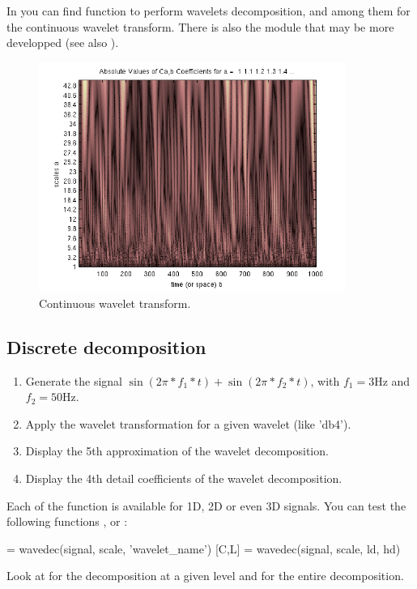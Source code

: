 \begin{phelp}
In  you can find function to perform wavelets decomposition, and among them  for the continuous wavelet transform. There is also the module  that may be more developped (see also ).
\end{phelp}

\begin{figure}[H]
 \centering\caption{Continuous wavelet transform.}%
 \includegraphics[width=10cm]{cwt.png}%
\end{figure}

\subsection{Discrete decomposition}

\begin{qbox}
 \begin{enumerate}
  \item Generate the signal $\sin(2\pi * f_1*t)+ \sin(2\pi*f_2*t)$, with $f_1=3$Hz and $f_2=50$Hz.
  \item Apply the wavelet transformation for a given wavelet (like 'db4'). 
  \item Display the 5th approximation of the wavelet decomposition.
  \item Display the 4th detail coefficients of the wavelet decomposition.
 \end{enumerate}
\end{qbox}

\begin{mcomment}
\begin{mremark}
Each of the \matlabregistered{} function is available for 1D, 2D or even 3D signals. You can test the following functions , 
 or :
\begin{matlab}
[C,L] = wavedec(signal, scale, 'wavelet_name')
[C,L] = wavedec(signal, scale, ld, hd)
\end{matlab}
\end{mremark}
\end{mcomment}
\begin{pcomment}
\begin{premark}
Look at  for the decomposition at a given level and  for the entire decomposition.
\end{premark}
\end{pcomment}
